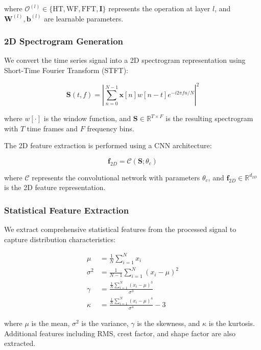 \documentclass[journal]{IEEEtran}
\begin{document}
where $\mathcal{O}^{(l)} \in \{\text{HT}, \text{WF}, \text{FFT}, \mathbf{I}\}$ represents the operation at layer $l$, and $\mathbf{W}^{(l)}, \mathbf{b}^{(l)}$ are learnable parameters.

\subsubsection{2D Spectrogram Generation}

We convert the time series signal into a 2D spectrogram representation using Short-Time Fourier Transform (STFT):

\begin{equation}
\mathbf{S}(t,f) = \left|\sum_{n=0}^{N-1} \mathbf{x}[n] w[n-t] e^{-i2\pi fn/N}\right|^2
\end{equation}

where $w[\cdot]$ is the window function, and $\mathbf{S} \in \mathbb{R}^{T \times F}$ is the resulting spectrogram with $T$ time frames and $F$ frequency bins.

The 2D feature extraction is performed using a CNN architecture:

\begin{equation}
\mathbf{f}_{2D} = \mathcal{C}(\mathbf{S}; \theta_c)
\end{equation}

where $\mathcal{C}$ represents the convolutional network with parameters $\theta_c$, and $\mathbf{f}_{2D} \in \mathbb{R}^{d_{2D}}$ is the 2D feature representation.

\subsubsection{Statistical Feature Extraction}

We extract comprehensive statistical features from the processed signal to capture distribution characteristics:

\begin{align}
\mu &= \frac{1}{N}\sum_{i=1}^{N} x_i \\
\sigma^2 &= \frac{1}{N-1}\sum_{i=1}^{N}(x_i - \mu)^2 \\
\gamma &= \frac{\frac{1}{N}\sum_{i=1}^{N}(x_i - \mu)^3}{\sigma^3} \\
\kappa &= \frac{\frac{1}{N}\sum_{i=1}^{N}(x_i - \mu)^4}{\sigma^4} - 3
\end{align}

where $\mu$ is the mean, $\sigma^2$ is the variance, $\gamma$ is the skewness, and $\kappa$ is the kurtosis. Additional features including RMS, crest factor, and shape factor are also extracted.
\end{document}
